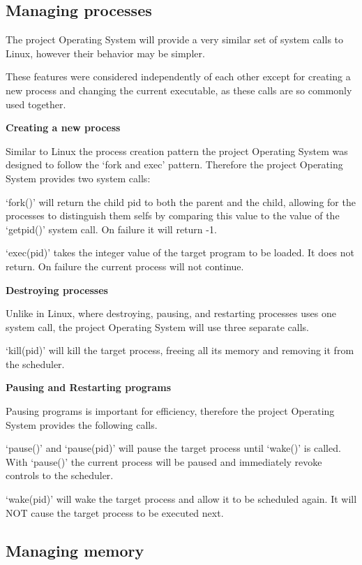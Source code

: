 \documentclass[a4paper]{report}
\begin{document}
\subsection{Managing processes}

The project Operating System will provide a very similar set of system calls to Linux, however their behavior may be simpler.

These features were considered independently of each other except for creating a new process and changing the current executable, as these calls are so commonly used together.

\textbf{Creating a new process}

Similar to Linux the process creation pattern the project Operating System was designed to follow the `fork and exec' pattern. Therefore the project Operating System provides two system calls:

`fork()' will return the child pid to both the parent and the child, allowing for the processes to distinguish them selfs by comparing this value to the value of the `get\textunderscore pid()' system call. On failure it will return -1.

`exec(pid)' takes the integer value of the target program to be loaded. It does not return. On failure the current process will not continue.

\textbf{Destroying processes}

Unlike in Linux, where destroying, pausing, and restarting processes uses one system call, the project Operating System will use three separate calls.

`kill(pid)' will kill the target process, freeing all its memory and removing it from the scheduler.

\textbf{Pausing and Restarting programs}

Pausing programs is important for efficiency, therefore the project Operating System provides the following calls.

`pause()' and `pause(pid)' will pause the target process until `wake()' is called. With `pause()' the current process will be paused and immediately revoke controls to the scheduler.

`wake(pid)' will wake the target process and allow it to be scheduled again. It will NOT cause the target process to be executed next.

\subsection{Managing memory}
\end{document}
